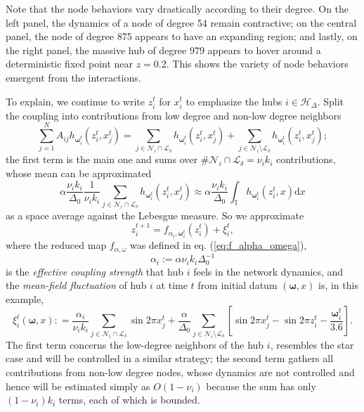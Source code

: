 \documentclass[a4paper]{article}
\theoremstyle{plain}
\theoremstyle{definition}
\newcommand{\T}{\mathbb{T}}
\newcommand{\Hil}{\mathcal{H}}
\newcommand{\Lil}{\mathcal{L}}
\newcommand{\Nil}{\mathcal{N}}
\begin{document}
Note that the node behaviors vary drastically according to their degree. On the left panel, the dynamics of a node of degree 54 remain contractive; on the central panel, the node of degree 875 appears to have an expanding region; and lastly, on the right panel, the massive hub of degree 979 appears to hover around a deterministic fixed point near $z=0.2$. This shows the variety of node behaviors emergent from the interactions.


To explain, we continue to write $z_i^t$ for $x_i^t$ to emphasize the hubs $i\in\Hil_{\Delta}$. Split the coupling into contributions from low degree and non-low degree neighbors 
$$\sum_{j=1}^N A_{ij}h_{\boldsymbol{\omega}_i^t}(z_i^t,x_j^t)=\sum_{j\in \Nil_i\cap \Lil_{\delta}} h_{\boldsymbol{\omega}_i^t}(z_i^t,x_j^t)+ \sum_{j\in \Nil_i\setminus\Lil_{\delta}} h_{\boldsymbol{\omega}_i^t}(z_i^t,x_j^t);$$ the first term is the main one and sums over $\# \Nil_i\cap \Lil_{\delta}=\nu_i k_i$ contributions, whose mean can be approximated 
\[
\alpha\frac{\nu_i k_i}{\Delta_0}\frac{1}{\nu_i k_i} \sum_{j\in \Nil_i\cap\Lil_{\delta}} h_{\boldsymbol{\omega}_i^t}(z_i^t, x_j^t) \approx   \alpha\frac{\nu_i k_i}{\Delta_0} \int_{\T} h_{\boldsymbol{\omega}_i^t} (z_i^t,x)\mathrm{d}x
\]
as a space average against the Lebesgue measure. %
So we approximate
$$z_i^{t+1} = f_{\alpha_i, \boldsymbol{\omega}_i^t}(z_i^t) + \xi_i^t,$$ 
where the reduced map $f_{\alpha,\omega}$ was defined in eq. (\ref{eq:f_alpha_omega}), 
\[
\alpha_i:= \alpha \nu_i  k_i \Delta_0^{-1}
\]
is the \textit{effective coupling strength} that hub $i$ feels in the network dynamics, and the \textit{mean-field fluctuation} of hub $i$ at time $t$ from initial datum $(\boldsymbol{\omega},x)$ is, in this example,
$$\xi_i^t(\boldsymbol{\omega},x): = \frac{\alpha_i}{\nu_ik_i} \sum_{j \in \Nil_i\cap\Lil_{\delta} }\sin 2\pi x_j^t + \frac{\alpha}{\Delta_0}\sum_{j\in \Nil_i\setminus \Lil_{\delta}} \left[\sin2\pi x_j^t - \sin 2\pi z_i^t - \frac{\boldsymbol{\omega}_i^t}{3.6}\right].$$ 
The first term concerns the low-degree neighbors of the hub $i$, resembles the star case and will be controlled in a similar strategy; the second term gathers all contributions from non-low degree nodes, whose dynamics are not controlled and hence will be estimated simply as $O(1-\nu_i)$ because the sum has only $(1-\nu_i)k_i$ terms, each of which is bounded.
\end{document}
